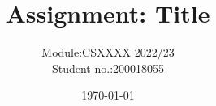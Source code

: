 


\title{Assignment: Title}
\author{
    \begin{tabular}{rl}
        Module:& CSXXXX 2022/23 \\
        Student no.:& 200018055 \\
    \end{tabular}
}
\date{\today}
\maketitle




